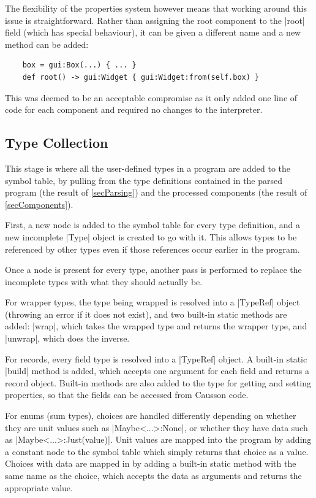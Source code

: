 \documentclass[11pt]{report}
\begin{document}
The flexibility of the properties system however means that working around this issue is straightforward. Rather than assigning the root component to the |root| field (which has special behaviour), it can be given a different name and a new method can be added:

\begin{Verbatim}
    box = gui:Box(...) { ... }
    def root() -> gui:Widget { gui:Widget:from(self.box) }
\end{Verbatim}

This was deemed to be an acceptable compromise as it only added one line of code for each component and required no changes to the interpreter.

\subsection{Type Collection} \label{secTypeCollection}

This stage is where all the user-defined types in a program are added to the symbol table, by pulling from the type definitions contained in the parsed program (the result of \cref{secParsing}) and the processed components (the result of \cref{secComponents}).

First, a new node is added to the symbol table for every type definition, and a new incomplete |Type| object is created to go with it. This allows types to be referenced by other types even if those references occur earlier in the program.

Once a node is present for every type, another pass is performed to replace the incomplete types with what they should actually be.

For wrapper types, the type being wrapped is resolved into a |TypeRef| object (throwing an error if it does not exist), and two built-in static methods are added: |wrap|, which takes the wrapped type and returns the wrapper type, and |unwrap|, which does the inverse.

For records, every field type is resolved into a |TypeRef| object. A built-in static |build| method is added, which accepts one argument for each field and returns a record object. Built-in methods are also added to the type for getting and setting properties, so that the fields can be accessed from Causson code.

For enums (sum types), choices are handled differently depending on whether they are unit values such as |Maybe<...>:None|, or whether they have data such as |Maybe<...>:Just(value)|. Unit values are mapped into the program by adding a constant node to the symbol table which simply returns that choice as a value. Choices with data are mapped in by adding a built-in static method with the same name as the choice, which accepts the data as arguments and returns the appropriate value.
\end{document}
